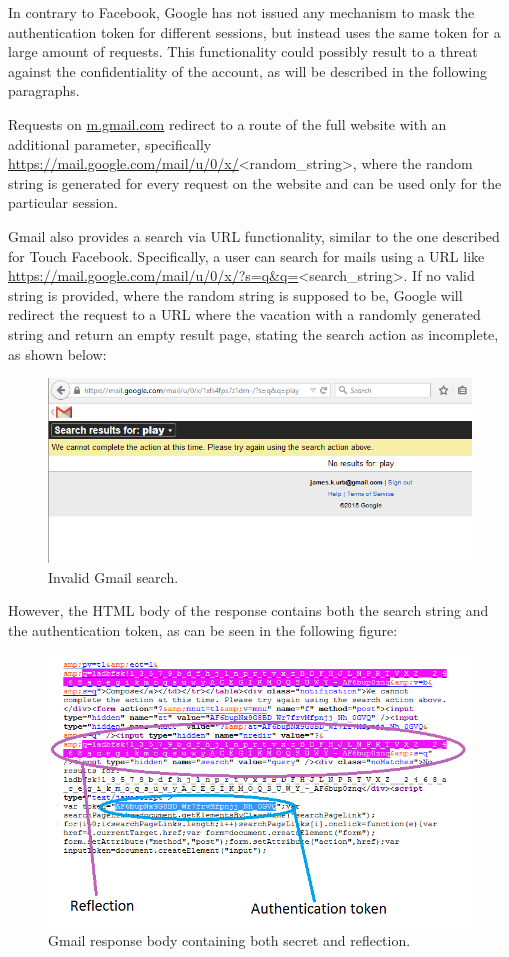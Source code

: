 In contrary to Facebook, Google has not issued any mechanism to mask the
authentication token for different sessions, but instead uses the same token for
a large amount of requests. This functionality could possibly result to a threat
against the confidentiality of the account, as will be described in the
following paragraphs.

Requests on \url{m.gmail.com} redirect to a route of the full website with an
additional parameter, specifically
\url{https://mail.google.com/mail/u/0/x/}<random\_string>, where the random
string is generated for every request on the website and can be used only for
the particular session.

Gmail also provides a search via URL functionality, similar to the one described
for Touch Facebook. Specifically, a user can search for mails using a URL like
    \url{https://mail.google.com/mail/u/0/x/?s=q&q=}<search\_string>. If no
    valid string is provided, where the random string is supposed to be, Google
    will redirect the request to a URL where the vacation with a randomly
    generated string and return an empty result page, stating the search action
    as incomplete, as shown below:

\begin{figure}[H] \caption{Invalid Gmail search.} \centering
\includegraphics[width=1\textwidth]{diagrams/gmail_search.png}\end{figure}

However, the HTML body of the response contains both the search string and the
authentication token, as can be seen in the following figure:

\begin{figure}[H] \caption{Gmail response body containing both secret and
reflection.} \centering
\includegraphics[width=1\textwidth]{diagrams/gmail_response.png}\end{figure}

